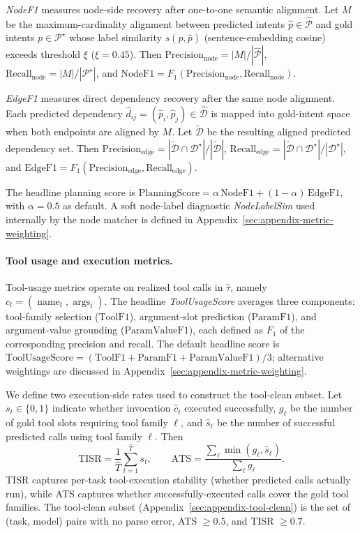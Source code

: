 \documentclass{article}
\begin{document}
\emph{NodeF1} measures node-side recovery after one-to-one semantic alignment. Let $M$ be the maximum-cardinality alignment between predicted intents $\hat p\in \widehat{\mathcal{P}}$ and gold intents $p\in \mathcal{P}^\star$ whose label similarity $s(p,\hat p)$ (sentence-embedding cosine) exceeds threshold $\xi$ ($\xi=0.45$). Then $\mathrm{Precision}_{\text{node}}=|M|/|\widehat{\mathcal{P}}|$, $\mathrm{Recall}_{\text{node}}=|M|/|\mathcal{P}^\star|$, and $\mathrm{NodeF1}=F_1(\mathrm{Precision}_{\text{node}},\mathrm{Recall}_{\text{node}})$.

\emph{EdgeF1} measures direct dependency recovery after the same node alignment. Each predicted dependency $\hat d_{ij}=(\hat p_i,\hat p_j)\in \widehat{\mathcal{D}}$ is mapped into gold-intent space when both endpoints are aligned by $M$. Let $\widetilde{\mathcal{D}}$ be the resulting aligned predicted dependency set. Then $\mathrm{Precision}_{\text{edge}}=|\widetilde{\mathcal{D}}\cap \mathcal{D}^\star|/|\widetilde{\mathcal{D}}|$, $\mathrm{Recall}_{\text{edge}}=|\widetilde{\mathcal{D}}\cap \mathcal{D}^\star|/|\mathcal{D}^\star|$, and $\mathrm{EdgeF1}=F_1(\mathrm{Precision}_{\text{edge}},\mathrm{Recall}_{\text{edge}})$.

The headline planning score is $\mathrm{PlanningScore} = \alpha\,\mathrm{NodeF1} + (1-\alpha)\,\mathrm{EdgeF1}$, with $\alpha=0.5$ as default. A soft node-label diagnostic \emph{NodeLabelSim} used internally by the node matcher is defined in Appendix~\ref{sec:appendix-metric-weighting}.

\paragraph{Tool usage and execution metrics.}
Tool-usage metrics operate on realized tool calls in $\widehat{\tau}$, namely $c_t=(\operatorname{name}_t,\operatorname{args}_t)$. The headline \emph{ToolUsageScore} averages three components: tool-family selection ($\mathrm{ToolF1}$), argument-slot prediction ($\mathrm{ParamF1}$), and argument-value grounding ($\mathrm{ParamValueF1}$), each defined as $F_1$ of the corresponding precision and recall. The default headline score is $\mathrm{ToolUsageScore} = (\mathrm{ToolF1} + \mathrm{ParamF1} + \mathrm{ParamValueF1})/3$; alternative weightings are discussed in Appendix~\ref{sec:appendix-metric-weighting}.

We define two execution-side rates used to construct the tool-clean subset. Let $s_t \in \{0,1\}$ indicate whether invocation $\hat{c}_t$ executed successfully, $g_\ell$ be the number of gold tool slots requiring tool family $\ell$, and $\hat{s}_\ell$ be the number of successful predicted calls using tool family $\ell$. Then
\[
\mathrm{TISR}=
\frac{1}{\widehat{T}}\sum_{t=1}^{\widehat{T}} s_t,
\qquad
\mathrm{ATS}=
\frac{\sum_{\ell}\min(g_\ell,\hat s_\ell)}
{\sum_{\ell}g_\ell}.
\]
TISR captures per-task tool-execution stability (whether predicted calls actually run), while ATS captures whether successfully-executed calls cover the gold tool families. The tool-clean subset (Appendix~\ref{sec:appendix-tool-clean}) is the set of (task, model) pairs with no parse error, ATS $\geq 0.5$, and TISR $\geq 0.7$.
\end{document}
